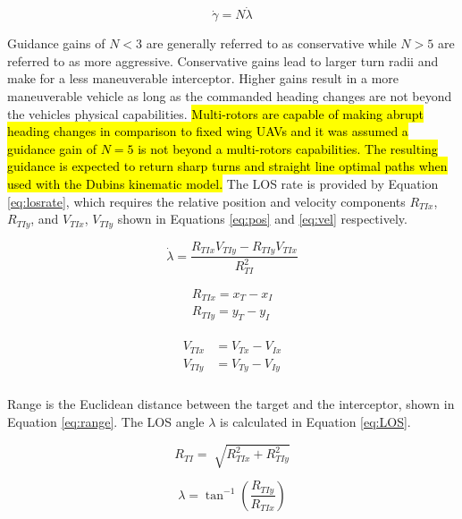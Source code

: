\documentclass[conference]{IEEEtran}
\begin{document}
\begin{equation} \label{eq:PNlaw}
\dot{\gamma} = N\dot{\lambda}
\end{equation}

Guidance gains of $N < 3$ are generally referred to as conservative while $N > 5$ are referred to as more aggressive. Conservative gains lead to larger turn radii and make for a less maneuverable interceptor. Higher gains result in a more maneuverable vehicle as long as the commanded heading changes are not beyond the vehicles physical capabilities. \hl{Multi-rotors are capable of making abrupt heading changes in comparison to fixed wing UAVs and it was assumed a guidance gain of $N = 5$ is not beyond a multi-rotors capabilities. The resulting guidance is expected to return sharp turns and straight line optimal paths when used with the Dubins kinematic model.} The LOS rate is provided by Equation \ref{eq:losrate}, which requires the relative position and velocity components $R_{TIx}$,$R_{TIy}$, and $V_{TIx}$, $V_{TIy}$ shown in Equations \ref{eq:pos} and \ref{eq:vel} respectively. 

\begin{equation} \label{eq:losrate}
\dot{\lambda} = \frac{R_{TIx}V_{TIy}-R_{TIy}V_{TIx}}{R_{TI}^2}
\end{equation}

\begin{equation} \label{eq:pos}
\begin{split}
R_{TIx} = x_T-x_I\\
R_{TIy} = y_T-y_I
\end{split}
\end{equation}

\begin{align}
\label{eq:vel}
\begin{split}
V_{TIx} &= V_{Tx}-V_{Ix}
\\
V_{TIy} &= V_{Ty}-V_{Iy}
\\
\end{split}
\end{align}

Range is the Euclidean distance between the target and the interceptor, shown in Equation \ref{eq:range}. The LOS angle $\lambda$ is calculated in Equation \ref{eq:LOS}. 

\begin{equation} \label{eq:range}
R_{TI} =\sqrt[]{R_{TIx}^2+R_{TIy}^2}
\end{equation}

\begin{equation} \label{eq:LOS}
\lambda = \tan^{-1} \left(\frac{R_{TIy}}{R_{TIx}}\right)
\end{equation}
\end{document}
